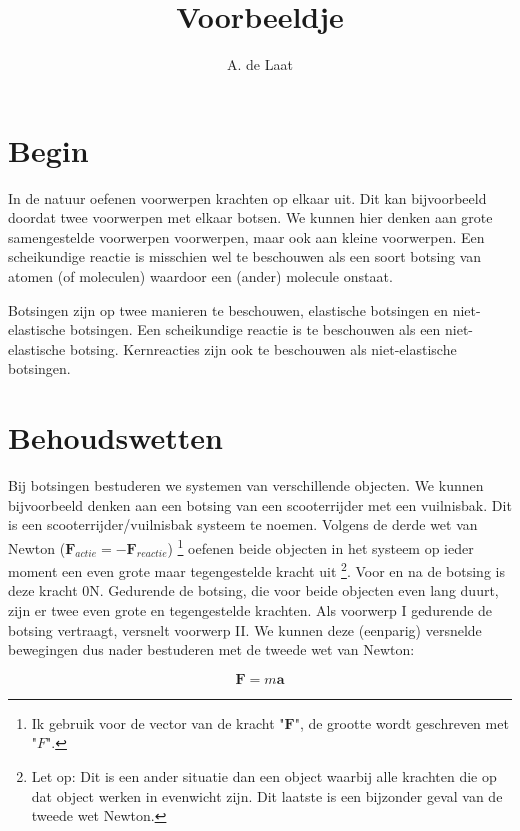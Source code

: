 



\title{Voorbeeldje}
\author{A. de Laat}
\date{}

\maketitle

\section{Begin}

In de natuur oefenen voorwerpen krachten op elkaar uit. Dit kan bijvoorbeeld
doordat twee voorwerpen met elkaar botsen. We kunnen hier denken aan
grote samengestelde voorwerpen voorwerpen, maar ook aan kleine voorwerpen.
Een scheikundige reactie is misschien wel te beschouwen als een soort
botsing van atomen (of moleculen) waardoor een (ander) molecule onstaat.

Botsingen zijn op twee manieren te beschouwen, elastische botsingen
en niet-elastische botsingen. Een scheikundige reactie is te beschouwen
als een niet-elastische botsing. Kernreacties zijn ook te beschouwen
als niet-elastische botsingen.


\section{Behoudswetten}

Bij botsingen bestuderen we systemen van verschillende objecten. We
kunnen bij\-voorbeeld denken aan een botsing van een scooterrijder met
een vuilnisbak. Dit is een scooterrijder/vuilnisbak systeem te noemen.
Volgens de derde wet van Newton
($\mathbf{F}_{actie}=-\mathbf{F}_{reactie}$) \footnote{Ik gebruik voor
de vector van de kracht "$\mathbf{F}$", de grootte wordt geschreven met
"$F$".} oefenen beide objecten in het systeem op ieder moment een even
grote maar tegengestelde kracht uit \footnote{Let op: Dit is een ander
situatie dan een object waarbij alle krachten die op dat object werken
in evenwicht zijn. Dit laatste is een bijzonder geval van de tweede wet
Newton.}. Voor en na de botsing is deze kracht 0N. Gedurende de botsing,
die voor beide objecten even lang duurt, zijn er twee even grote en
tegengestelde krachten. Als voorwerp I gedurende de botsing vertraagt,
versnelt voorwerp II. We kunnen deze (eenparig) versnelde bewegingen dus
nader bestuderen met de tweede wet van Newton:

\begin{equation}
    \mathbf{F}=m\mathbf{a}
\end{equation}

